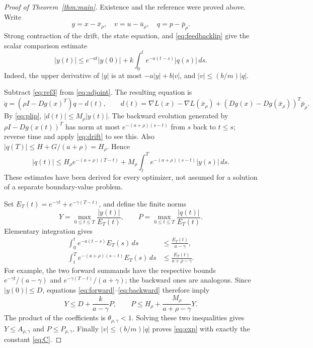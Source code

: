\documentclass[11pt,a4paper]{article}
\begin{document}
\begin{proof}[Proof of Theorem~\ref{thm:main}]
Existence and the reference were proved above. Write
\[
 y=x-\bar x_\rho,\quad v=u-\bar u_\rho,\quad q=p-\bar p_\rho.
\]
Strong contraction of the drift, the state equation, and
\eqref{eq:feedbacklip} give the scalar comparison estimate
\begin{equation}\label{eq:forward}
 |y(t)|\leq e^{-at}|y(0)|
       +k\int_0^t e^{-a(t-s)}|q(s)|\,ds.
\end{equation}
Indeed, the upper derivative of $|y|$ is at most $-a|y|+b|v|$,
and $|v|\leq(b/m)|q|$.

Subtract \eqref{eq:ref3} from \eqref{eq:adjoint}. The resulting equation is
\[
 \dot q=(\rho I-Dg(x)^T)q-d(t),\qquad
 d(t)=\nabla L(x)-\nabla L(\bar x_\rho)
            +(Dg(x)-Dg(\bar x_\rho))^T\bar p_\rho.
\]
By \eqref{eq:plip}, $|d(t)|\leq M_\rho|y(t)|$.
The backward evolution generated by $\rho I-Dg(x(t))^T$ has norm at most
$e^{-(a+\rho)(s-t)}$ from $s$ back to $t\leq s$; reverse time and apply
\eqref{eq:drift} to see this. Also
$|q(T)|\leq H+G/(a+\rho)=H_\rho$. Hence
\begin{equation}\label{eq:backward}
 |q(t)|\leq H_\rho e^{-(a+\rho)(T-t)}
       +M_\rho\int_t^T e^{-(a+\rho)(s-t)}|y(s)|\,ds.
\end{equation}
These estimates have been derived for every optimizer, not assumed for a
solution of a separate boundary-value problem.

Set $E_T(t)=e^{-\gamma t}+e^{-\gamma(T-t)}$, and define the finite norms
\[
 Y=\max_{0\leq t\leq T}\frac{|y(t)|}{E_T(t)},\qquad
 P=\max_{0\leq t\leq T}\frac{|q(t)|}{E_T(t)}.
\]
Elementary integration gives
\begin{align*}
 \int_0^t e^{-a(t-s)}E_T(s)\,ds
     &\leq \frac{E_T(t)}{a-\gamma},\\
 \int_t^T e^{-(a+\rho)(s-t)}E_T(s)\,ds
     &\leq \frac{E_T(t)}{a+\rho-\gamma}.
\end{align*}
For example, the two forward summands have the respective bounds
$e^{-\gamma t}/(a-\gamma)$ and
$e^{-\gamma(T-t)}/(a+\gamma)$; the backward ones are analogous.
Since $|y(0)|\leq D$, equations \eqref{eq:forward}--\eqref{eq:backward}
therefore imply
\[
 Y\leq D+\frac{k}{a-\gamma}P,
 \qquad
 P\leq H_\rho+\frac{M_\rho}{a+\rho-\gamma}Y.
\]
The product of the coefficients is $\theta_{\rho,\gamma}<1$.
Solving these two inequalities gives $Y\leq A_{\rho,\gamma}$ and
$P\leq P_{\rho,\gamma}$. Finally
$|v|\leq(b/m)|q|$ proves \eqref{eq:exp} with exactly the constant
\eqref{eq:C}.


\end{proof}
\end{document}
